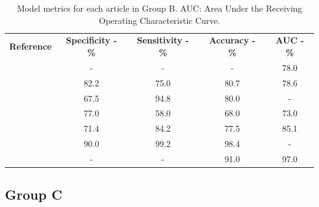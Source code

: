 \documentclass[11pt]{article}
\begin{document}
\begin{table}[]
    \centering
    \begin{tabular}{ccccc}\toprule
        \multirow{2}{*}{\textbf{Reference}} & \multirow{2}{*}{\textbf{Specificity - \%}} & \multirow{2}{*}{\textbf{Sensitivity - \%}} & \multirow{2}{*}{\textbf{Accuracy - \%}} & \multirow{2}{*}{\textbf{AUC - \%}} \\
        \\\midrule
        \cite{Shoemaker2018}                & -                                          & -                                          & -                                       & 78.0                               \\
        \cite{Koyuncu2019}                  & 82.2                                       & 75.0                                       & 80.7                                    & 78.6                               \\
        \cite{Li2019}                       & 67.5                                       & 94.8                                       & 80.0                                    & -                                  \\
        \cite{Andersen2021}                 & 77.0                                       & 58.0                                       & 68.0                                    & 73.0                               \\
        \cite{Moawad2021}                   & 71.4                                       & 84.2                                       & 77.5                                    & 85.1                               \\
        \cite{Barstugan2020}                & 90.0                                       & 99.2                                       & 98.4                                    & -                                  \\
        \cite{Stanzione2021}                & -                                          & -                                          & 91.0                                    & 97.0                               \\
        \bottomrule
    \end{tabular}
    \caption{Model metrics for each article in Group B. AUC: Area Under the Receiving Operating Characteristic Curve.}
    \label{tab:res_B}
\end{table}

\subsection{Group C}
\end{document}
